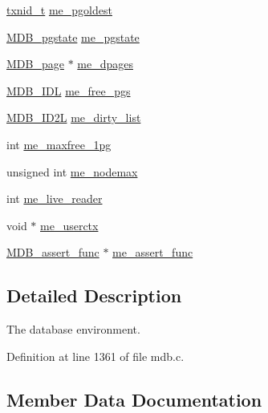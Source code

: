 \begin{DoxyCompactItemize}
\mbox{\hyperlink{group__internal_gabbaef7c9c710f8652a62c32d748c040e}{txnid\+\_\+t}} \mbox{\hyperlink{struct_m_d_b__env_ae2a8e75689dba70d92b5641711b3415a}{me\+\_\+pgoldest}}
\item 
\mbox{\hyperlink{struct_m_d_b__pgstate}{M\+D\+B\+\_\+pgstate}} \mbox{\hyperlink{struct_m_d_b__env_a0db706a72d88cfe0e32f7ab80a4afa8b}{me\+\_\+pgstate}}
\item 
\mbox{\hyperlink{struct_m_d_b__page}{M\+D\+B\+\_\+page}} $\ast$ \mbox{\hyperlink{struct_m_d_b__env_aeeb32fbf8557f37a933c762f391090ce}{me\+\_\+dpages}}
\item 
\mbox{\hyperlink{group__idls_ga238cc39c422225e05cb3897e641ca9e5}{M\+D\+B\+\_\+\+I\+DL}} \mbox{\hyperlink{struct_m_d_b__env_a440e7c52dc9d6bc4828c7484f78d2b9b}{me\+\_\+free\+\_\+pgs}}
\item 
\mbox{\hyperlink{group__idls_gafcc5d61c06c726db2be5d088dbc68d51}{M\+D\+B\+\_\+\+I\+D2L}} \mbox{\hyperlink{struct_m_d_b__env_a42dac152902b215639f9c8468b16608c}{me\+\_\+dirty\+\_\+list}}
\item 
int \mbox{\hyperlink{struct_m_d_b__env_aa428623a5a2731349c49a611fddd3d73}{me\+\_\+maxfree\+\_\+1pg}}
\item 
unsigned int \mbox{\hyperlink{struct_m_d_b__env_a718cafb69c2a74164b79a874f6aee9e0}{me\+\_\+nodemax}}
\item 
int \mbox{\hyperlink{struct_m_d_b__env_ab0aee4c3cd1006e27d8d76c4634c742e}{me\+\_\+live\+\_\+reader}}
\item 
void $\ast$ \mbox{\hyperlink{struct_m_d_b__env_ac71142f4e056b082f9d866d1561764e5}{me\+\_\+userctx}}
\item 
\mbox{\hyperlink{group__mdb_ga949ada362b3e84ec0435197056d82371}{M\+D\+B\+\_\+assert\+\_\+func}} $\ast$ \mbox{\hyperlink{struct_m_d_b__env_adac96bf9a61afe2859f3beee7ee224e8}{me\+\_\+assert\+\_\+func}}
\end{DoxyCompactItemize}


\subsection{Detailed Description}
The database environment. 

Definition at line 1361 of file mdb.\+c.



\subsection{Member Data Documentation}
\mbox{\label{struct_m_d_b__env_adac96bf9a61afe2859f3beee7ee224e8}} 
